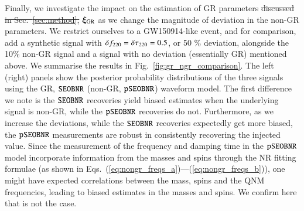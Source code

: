 Finally, we investigate the impact on the estimation of  GR parameters
\sout{discussed in Sec.~\ref{sec:method},} $\bm{\xi}_{\text{GR}}$ as we change the
magnitude of deviation in the non-GR parameters. We restrict ourselves 
to a GW150914-like event, and for comparison, add a synthetic signal
with $\delta f_{\text{220}} = \delta \tau_{\text{220}} = 0.5$, or 50 \% deviation, alongside the
10\% non-GR signal and a signal with no deviation (essentially GR)
mentioned above. We summarise the results in
Fig.~\ref{fig:gr_ngr_comparison}. The left (right) panels show the
posterior probability distributions of the three signals using the GR,
$\texttt{SEOBNR}$ (non-GR, $\texttt{pSEOBNR}$) waveform model. The first difference we
note is the $\texttt{SEOBNR}$ recoveries yield biased estimates when the
underlying signal is non-GR, while the $\texttt{pSEOBNR}$ recoveries do
not. Furthermore, as we increase the deviations, while the $\texttt{SEOBNR}$
recoveries expectedly get more biased, the $\texttt{pSEOBNR}$ measurements are
robust in consistently recovering the injected value. Since the
measurement of the frequency and damping time in the $\texttt{pSEOBNR}$ model
incorporate information from the masses and spins through the NR
fitting formulae (as shown in
Eqs.~(\ref{eq:nongr_freqs_a})---(\ref{eq:nongr_freqs_b})), one might have
expected correlations between the mass, spins and the QNM frequencies,
leading to biased estimates in the masses and spins. We confirm here
that is not the case.

